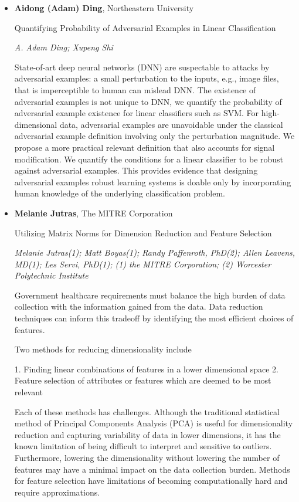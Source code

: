 \begin{itemize}
\item \textbf{Aidong (Adam) Ding}, Northeastern University

Quantifying Probability of Adversarial Examples in Linear Classification

\emph{\footnotesize A. Adam Ding; Xupeng Shi}

State-of-art deep neural networks (DNN) are suspectable to attacks by adversarial examples: a small perturbation to the inputs, e.g., image files, that is imperceptible to human can mislead DNN. The existence of adversarial examples is not unique to DNN, we quantify the probability of adversarial example existence for linear classifiers such as SVM. For high-dimensional data, adversarial examples are unavoidable under the classical adversarial example definition involving only the perturbation magnitude. We propose a more practical relevant definition that also accounts for signal modification. We quantify the conditions for a linear classifier to be robust against adversarial examples. This provides evidence that designing adversarial examples robust learning systems is doable only by incorporating human knowledge of the underlying classification problem.

\item \textbf{Melanie Jutras}, The MITRE Corporation

Utilizing Matrix Norms for Dimension Reduction and Feature Selection

\emph{\footnotesize Melanie Jutras(1); Matt Boyas(1); Randy Paffenroth, PhD(2); Allen Leavens, MD(1); Les Servi, PhD(1); (1) the MITRE Corporation; (2) Worcester Polytechnic Institute}

Government healthcare requirements must balance the high burden of data collection with the information gained from the data.  Data reduction techniques can inform this tradeoff by identifying the most efficient choices of features.  

Two methods for reducing dimensionality include 

1. Finding linear combinations of features in a lower dimensional space
2. Feature selection of attributes or features which are deemed to be most relevant

Each of these methods has challenges. Although the traditional statistical method of Principal Components Analysis (PCA) is useful for dimensionality reduction and capturing variability of data in lower dimensions, it has the known limitation of being difficult to interpret and sensitive to outliers. Furthermore, lowering the dimensionality without lowering the number of features may have a minimal impact on the data collection burden.  Methods for feature selection have limitations of becoming computationally hard and require approximations.  


\end{itemize}
